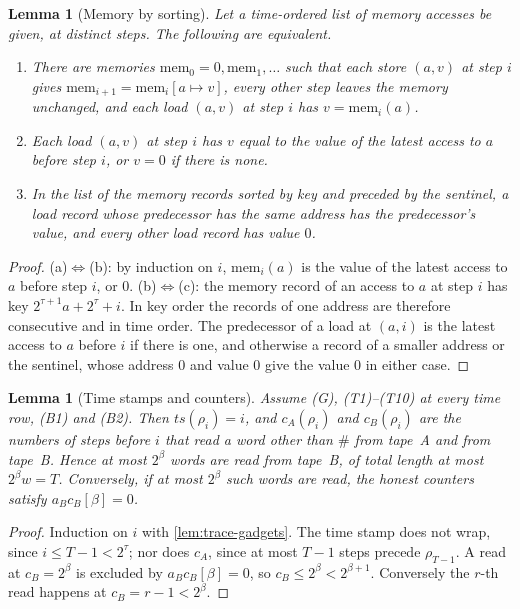 \documentclass[11pt,letterpaper]{article}
\newtheorem{lemma}[theorem]{Lemma}
\theoremstyle{definition}
\theoremstyle{remark}
\begin{document}
\begin{lemma}[Memory by sorting]\label{lem:trace-memory}
Let a time-ordered list of memory accesses be given, at distinct steps.
The following are equivalent.
\begin{enumerate}[label=(\alph*)]
\item There are memories \(\mathrm{mem}_0=0,\mathrm{mem}_1,\ldots\) such
that each store \((a,v)\) at step \(i\) gives
\(\mathrm{mem}_{i+1}=\mathrm{mem}_i[a\mapsto v]\), every other step
leaves the memory unchanged, and each load \((a,v)\) at step \(i\) has
\(v=\mathrm{mem}_i(a)\).
\item Each load \((a,v)\) at step \(i\) has \(v\) equal to the value of
the latest access to \(a\) before step \(i\), or \(v=0\) if there is
none.
\item In the list of the memory records sorted by key and preceded by
the sentinel, a load record whose predecessor has the same address has
the predecessor's value, and every other load record has value \(0\).
\end{enumerate}
\end{lemma}
\begin{proof}
(a)\(\Leftrightarrow\)(b): by induction on \(i\), \(\mathrm{mem}_i(a)\) is
the value of the latest access to \(a\) before step \(i\), or \(0\).
(b)\(\Leftrightarrow\)(c): the memory record of an access to \(a\) at
step \(i\) has key \(2^{\tau+1}a+2^\tau+i\). In key order the records of
one address are therefore consecutive and in time order. The
predecessor of a load at \((a,i)\) is the latest access to \(a\) before
\(i\) if there is one, and otherwise a record of a smaller address or
the sentinel, whose address \(0\) and value \(0\) give the value \(0\)
in either case.
\end{proof}

\begin{lemma}[Time stamps and counters]\label{lem:trace-counters}
Assume (G), (T1)--(T10) at every time row, (B1) and (B2). Then
\(\mathit{ts}(\rho_i)=i\), and \(c_A(\rho_i)\) and \(c_B(\rho_i)\) are
the numbers of steps before \(i\) that read a word other than \(\#\)
from tape~A and from tape~B. Hence at most \(2^\beta\) words are read
from tape~B, of total length at most \(2^\beta w=T\). Conversely, if at
most \(2^\beta\) such words are read, the honest counters satisfy
\(a_Bc_B[\beta]=0\).
\end{lemma}
\begin{proof}
Induction on \(i\) with \cref{lem:trace-gadgets}. The time stamp does
not wrap, since \(i\le T-1<2^\tau\); nor does \(c_A\), since at most
\(T-1\) steps precede \(\rho_{T-1}\). A read at \(c_B=2^\beta\) is
excluded by \(a_Bc_B[\beta]=0\), so \(c_B\le2^\beta<2^{\beta+1}\).
Conversely the \(r\)-th read happens at \(c_B=r-1<2^\beta\).
\end{proof}
\end{document}
